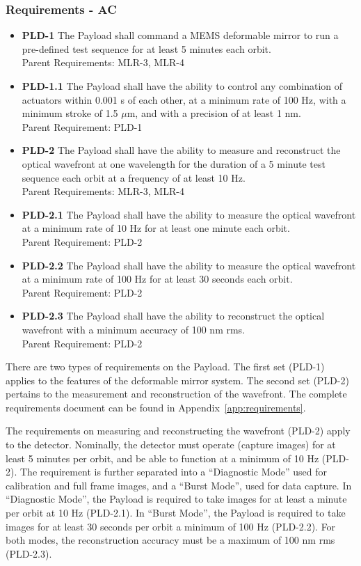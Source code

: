 \documentclass[12pt]{article}
\begin{document}
\subsubsection{Requirements - AC}\label{sec:payload_requirements}

\begin{itemize}
\item \textbf{PLD-1} The Payload shall command a MEMS deformable mirror to run a pre-defined test sequence for at least 5 minutes each orbit. \\ 
Parent Requirements: MLR-3, MLR-4
\item \textbf{PLD-1.1} The Payload shall have the ability to control any combination of actuators within 0.001 s of each other, at a minimum rate of 100 Hz, with a minimum stroke of 1.5  $\mu$m, and with a precision of at least 1 nm.\\
Parent Requirement: PLD-1
\item \textbf{PLD-2} The Payload shall have the ability to measure and reconstruct the optical wavefront at one wavelength for the duration of a 5 minute test sequence each orbit at a frequency of at least 10 Hz.\\
Parent Requirements: MLR-3, MLR-4
\item \textbf{PLD-2.1} The Payload shall have the ability to measure the optical wavefront at a minimum rate of 10 Hz for at least one minute each orbit.\\
Parent Requirement: PLD-2
\item \textbf{PLD-2.2} The Payload shall have the ability to measure the optical wavefront at a minimum rate of 100 Hz for at least 30 seconds each orbit.\\
Parent Requirement: PLD-2
\item \textbf{PLD-2.3} The Payload shall have the ability to reconstruct the optical wavefront with a minimum accuracy of 100 nm rms.\\
Parent Requirement: PLD-2
\end{itemize}

There are two types of requirements on the Payload.  The first set (PLD-1) applies to the features of the deformable mirror system.  The second set (PLD-2) pertains to the measurement and reconstruction of the wavefront.  The complete requirements document can be found in Appendix~\ref{app:requirements}. 

The requirements on measuring and reconstructing the wavefront (PLD-2) apply to the detector.  Nominally, the detector must operate (capture images) for at least 5 minutes per orbit, and be able to function at a minimum of 10 Hz (PLD-2). The requirement is further separated into a ``Diagnostic Mode'' used for calibration and full frame images, and a ``Burst Mode'', used for data capture.  In ``Diagnostic Mode'', the Payload is required to take images for at least a minute per orbit at 10 Hz (PLD-2.1).  In ``Burst Mode'', the Payload is required to take images for at least 30 seconds per orbit a minimum of 100 Hz (PLD-2.2).  For both modes, the reconstruction accuracy must be a maximum of 100 nm rms (PLD-2.3).
			
\end{document}
